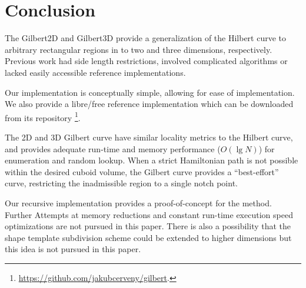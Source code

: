 \section{Conclusion}

The Gilbert2D and Gilbert3D provide a generalization of the Hilbert curve to
arbitrary rectangular regions in to two and three dimensions, respectively.
Previous work had side length restrictions, involved complicated algorithms or lacked
easily accessible reference implementations.

Our implementation is conceptually simple, allowing for ease of implementation.
We also provide a libre/free 
reference implementation which can be downloaded from
its repository \footnote{ \label{gilbert-url} \url{https://github.com/jakubcerveny/gilbert}. }.

The 2D and 3D Gilbert curve have similar locality metrics to the Hilbert
curve, and provides adequate run-time and memory performance
($O(\lg N)$) for enumeration and random lookup.
When a strict Hamiltonian path is not possible within the desired cuboid volume, the
Gilbert curve provides a ``best-effort'' curve, restricting the inadmissible region
to a single notch point.

Our recursive implementation provides a proof-of-concept for the method.
Further Attempts at memory reductions and constant run-time execution speed optimizations are not pursued in this paper.
There is also a possibility that the shape template subdivision scheme could be extended to higher dimensions but this idea is not
pursued in this paper.




